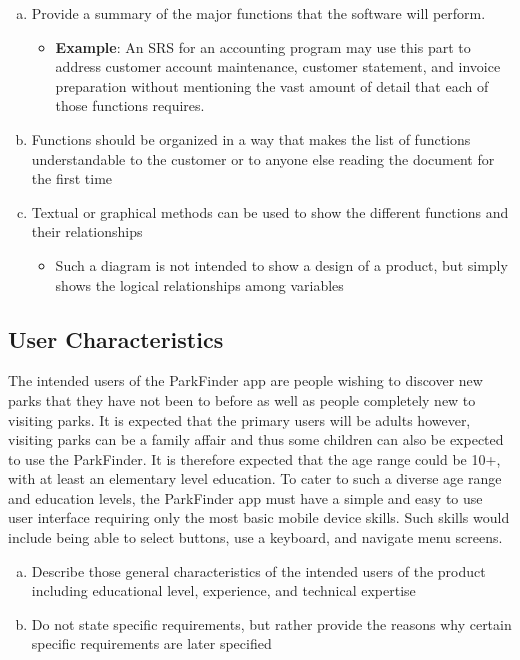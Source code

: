 \documentclass[]{article}
\begin{document}
\color{red}
\begin{enumerate}[a)]
	\item Provide a summary of the major functions that the software will perform.
	\begin{itemize}
        \item \textbf{Example}: An SRS for an accounting program may use this part to address
        customer account maintenance, customer statement, and invoice preparation without mentioning
        the vast amount of detail that each of those functions requires.
	\end{itemize}
    \item Functions should be organized in a way that makes the list of functions understandable to
    the customer or to anyone else reading the document for the first time
    \item Textual or graphical methods can be used to show the different functions and their
    relationships
	\begin{itemize}
        \item Such a diagram is not intended to show a design of a product, but simply shows the
        logical relationships among variables
	\end{itemize} 
\end{enumerate}
\color{black}

\subsection{User Characteristics}%
\label{sub:user_characteristics}
The intended users of the ParkFinder app are people wishing to discover new parks that they have not
been to before as well as people completely new to visiting parks. It is expected that the primary
users will be adults however, visiting parks can be a family affair and thus some children can also
be expected to use the ParkFinder. It is therefore expected that the age range could be 10+, with
at least an elementary level education. To cater to such a diverse age range and education levels,
the ParkFinder app must have a simple and easy to use user interface requiring only the most basic
mobile device skills. Such skills would include being able to select buttons, use a keyboard, and
navigate menu screens.


\color{red}
\begin{enumerate}[a)]
	\item Describe those general characteristics of the intended users of the product including
	educational level, experience, and technical expertise
	\item Do not state specific requirements, but rather provide the reasons why certain specific
	requirements are later specified
\end{enumerate}
\color{black}
\end{document}
